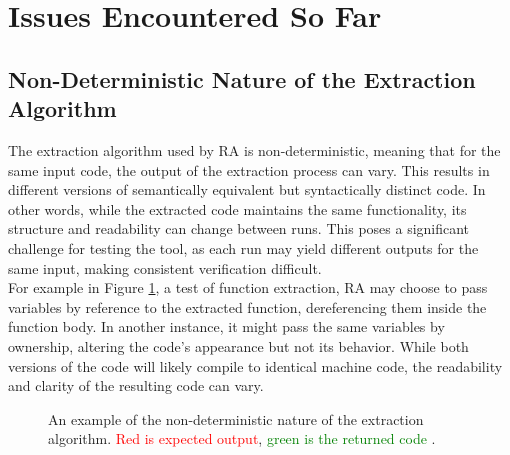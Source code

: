 \section{Issues Encountered So Far}

\subsection*{Non-Deterministic Nature of the Extraction Algorithm}

The extraction algorithm used by RA is non-deterministic,
meaning that for the same input code, the output of the extraction process can
vary. This results in different versions of semantically equivalent but
syntactically distinct code. In other words, while the extracted code maintains
the same functionality, its structure and readability can change between runs.
This poses a significant challenge for testing the tool, as each run may yield
different outputs for the same input, making consistent verification difficult. \\
For example in Figure \ref{fig:issue1}, a test of function extraction, RA may choose to pass
variables by reference to the extracted function, dereferencing them inside the
function body. In another instance, it might pass the same variables by
ownership, altering the code's appearance but not its behavior. While both
versions of the code will likely compile to identical machine code, the
readability and clarity of the resulting code can vary.

\begin{figure}[H]
    \centering
    \sbox{}
    \usebox\mysavebox
    \par
    \begin{minipage}{\wd\mysavebox}
        \caption{An example of the non-deterministic nature of the extraction
        algorithm. \textcolor{red}{Red is expected output}, \textcolor{green}{green is the
        returned code} \label{fig:issue1}.}
    \end{minipage}
\end{figure}


